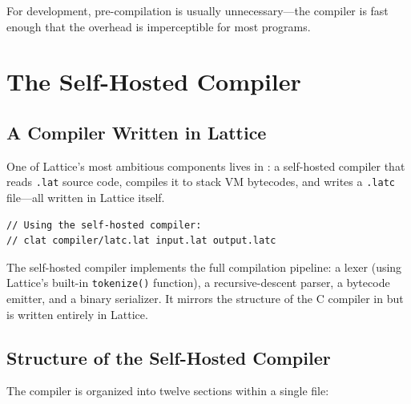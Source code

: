 For development, pre-compilation is usually unnecessary---the compiler is fast enough that the overhead is imperceptible for most programs.


\section{The Self-Hosted Compiler}\label{sec:self-hosted}

\subsection{A Compiler Written in Lattice}

One of Lattice's most ambitious components lives in : a self-hosted compiler that reads \lstinline|.lat| source code, compiles it to stack VM bytecodes, and writes a \lstinline|.latc| file---all written in Lattice itself.

\begin{lstlisting}[language=Lattice, caption={Running the self-hosted compiler}]
// Using the self-hosted compiler:
// clat compiler/latc.lat input.lat output.latc
\end{lstlisting}

The self-hosted compiler implements the full compilation pipeline: a lexer (using Lattice's built-in \lstinline|tokenize()| function), a recursive-descent parser, a bytecode emitter, and a binary serializer. It mirrors the structure of the C compiler in  but is written entirely in Lattice.

\subsection{Structure of the Self-Hosted Compiler}

The compiler is organized into twelve sections within a single file:

